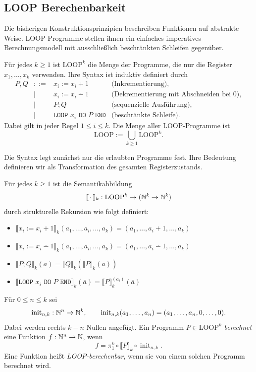 \subsection{LOOP Berechenbarkeit}
\label{sec:loop-berechenbarkeit}

Die bisherigen Konstruktionsprinzipien beschreiben Funktionen auf abstrakte
Weise. LOOP-Programme stellen ihnen ein einfaches imperatives Berechnungsmodell
mit ausschließlich beschränkten Schleifen gegenüber.
\begin{Def}[name={LOOP-Programme}]\label{def:LOOP-Programme}
  Für jedes $k\geq1$ ist $\mathrm{LOOP}^k$ die Menge der Programme, die nur
  die Register $x_1,\dots,x_k$ verwenden. Ihre Syntax ist induktiv definiert
  durch
  \[
    \begin{array}{rcll}
      P,Q &::=& x_i := x_i+1
      & \text{(Inkrementierung)},\\
          &\mid& x_i := x_i\dotminus 1
      & \text{(Dekrementierung mit Abschneiden bei $0$)},\\
          &\mid& P;Q
      & \text{(sequenzielle Ausführung)},\\
          &\mid& \texttt{LOOP }x_i\texttt{ DO }P\texttt{ END}
      & \text{(beschränkte Schleife)}.
    \end{array}
  \]
  Dabei gilt in jeder Regel $1\leq i\leq k$. Die Menge aller LOOP-Programme ist
  \[
    \mathrm{LOOP}:=\bigcup_{k\geq1}\mathrm{LOOP}^k.
  \]
\end{Def}
Die Syntax legt zunächst nur die erlaubten Programme fest. Ihre Bedeutung
definieren wir als Transformation des gesamten Registerzustands.
\begin{Def}\label{def:LOOP-Semantik}
  Für jedes $k\geq1$ ist die Semantikabbildung
  \[
    [\![\,\cdot\,]\!]_k:
    \mathrm{LOOP}^k\to(\mathbb{N}^k\to\mathbb{N}^k)
  \]
  durch strukturelle Rekursion wie folgt definiert:
  \begin{itemize}
  \item $\llbracket x_i := x_i+1 \rrbracket_k (a_1, \dots, a_i, \dots, a_k) =
    (a_1, \dots, a_i+1, \dots, a_k)$
  \item $\llbracket x_i := x_i\dotminus 1 \rrbracket_k (a_1, \dots, a_i, \dots, a_k) =
    (a_1, \dots, a_i\dotminus 1, \dots, a_k)$
  \item $\llbracket P;Q \rrbracket_k (\overline{a}) =
    \llbracket Q \rrbracket_k (\llbracket P \rrbracket_k (\overline{a}))$
  \item $\llbracket \texttt{LOOP }x_i\texttt{ DO }P\texttt{ END} \rrbracket_k
    (\overline{a}) = \llbracket P \rrbracket_k^{(a_i)} (\overline{a})$
  \end{itemize}


  Für $0\leq n\leq k$ sei
  \[
    \operatorname{init}_{n,k}:\mathbb{N}^n\to\mathbb{N}^k,
    \qquad
    \operatorname{init}_{n,k}(a_1,\dots,a_n)
      =(a_1,\dots,a_n,0,\dots,0).
  \]
  Dabei werden rechts $k-n$ Nullen angefügt.
  Ein Programm $P\in\mathrm{LOOP}^k$ \emph{berechnet} eine Funktion
  $f:\mathbb{N}^n\to\mathbb{N}$, wenn
  \[
    f=\pi_1^k\circ\llbracket P\rrbracket_k
      \circ\operatorname{init}_{n,k}.
  \]
  Eine Funktion heißt \emph{LOOP-berechenbar}, wenn sie von einem solchen
  Programm berechnet wird.
\end{Def}

